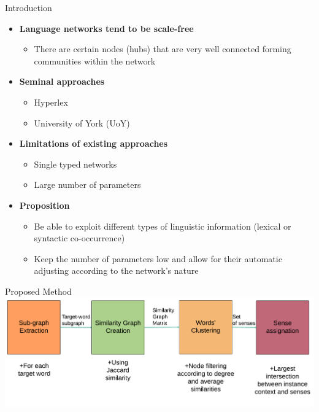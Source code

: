 \documentclass[10pt,=table]{beamer}
\begin{document}
\begin{frame}{Introduction}

	\begin{itemize}
		\item<1-> \large \textbf{Language networks tend to be scale-free}	
			\begin{itemize}
				\item<1-> There are certain nodes (hubs) that are very well connected forming communities within the network
			\end{itemize}
%
		\item<2-> \large \textbf{Seminal approaches}
			\begin{itemize}
				\item<2-> Hyperlex \cite{2004.Veronis}
				\item<2-> University of York (UoY) \cite{2007.Klapaftis.UOY}
			\end{itemize}
		\item<3-> \textbf{Limitations of existing approaches}
		\begin{itemize}
			\item<3-> Single typed networks
			\item<3-> Large number of parameters
		\end{itemize}
		\item<4-> \textbf{Proposition}
		\begin{itemize}
				\item<4-> Be able to exploit different types of linguistic information (lexical or syntactic co-occurrence)
				\item<4-> Keep  the number of parameters low and allow for their automatic adjusting according to the network's nature
		
		\end{itemize}
\end{itemize}
\vspace{\textheight}	
\end{frame}
\begin{frame}{Proposed Method}
  \centering
  \includegraphics[width=1\linewidth]{img/wsd_wsi.png}

\end{frame}
\end{document}
